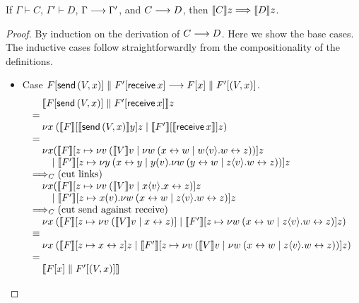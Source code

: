 \documentclass[orivec,envcountsame]{llncs}
\begin{document}
\begin{theorem}\label{thm:gv-reduction-simulated}
If $\Gamma \vdash C$, $\Gamma' \vdash D$, $\Gamma \longrightarrow \Gamma'$, and $C \longrightarrow D$, then $\llbracket C \rrbracket z
\Longrightarrow \llbracket D \rrbracket z$.
\end{theorem}
\begin{proof}
By induction on the derivation of $C \longrightarrow D$. Here we show the base cases. The inductive cases
follow straightforwardly from the compositionality of the definitions.
\begin{itemize}
\item Case $F[\mathsf{send} \, (V,x)] \parallel F'[\mathsf{receive} \, x] \longrightarrow F[x]
  \parallel F'[(V,x)]$.
%
\[
\bl
\quad \tocp{\Fx[\gvconst{send} \app (V,x)] \parallel \Fx'[\gvconst{receive} \app x]}z \\
= \\
\quad \cut{x}{}
        {\tocp{\Fx}[\tocp{\gvconst{send} \app (V,x)}y]z}
        {\tocp{\Fx'}[\tocp{\gvconst{receive} \app x}]z} \\
= \\
\quad
  \nu x(
    {\tocp{\Fx}
      [z \mapsto \cut{v}{}{\tocp{V}v}
        {\cut{w}{}{\link{x}{w}}{w\sd{v}.\link{w}{z}}}]z} \\
\qquad \mid
    {\tocp{\Fx'}
       [z \mapsto \cut{y}{}
          {\link{x}{y}}
          {y(v).\cut{w}{}{\link{y}{w}}{z\sd{v}.\link{w}{z}}}]z} \\
\bigcrto (\text{cut links}) \\
\quad
  \nu x(
    {\tocp{\Fx}
       [z \mapsto \cut{v}{}{\tocp{V}v}
         {x\sd{v}.\link x z}]z} \\
\qquad \mid
    {\tocp{\Fx'}
       [z \mapsto x(v).\cut{w}{}{\link{x}{w}}{z\sd{v}.\link{w}{z}}]z} \\
\bigcrto (\text{cut send against receive}) \\
\quad
  \cut{x}{}
    {\tocp{\Fx}
       [z \mapsto
         \cut{v}{}{\tocp{V}v}{\link x z}]}
    {\tocp{\Fx'}
       [z \mapsto \cut{w}{}{\link{x}{w}}{z\sd{v}.\link{w}{z}}]z} \\
\equiv \\
\quad
  \cut{x}{}
    {\tocp{\Fx}[z \mapsto \link x z]z}
    {\tocp{\Fx'}[z \mapsto
      \cut{v}{}{\tocp{V}v}
        {\cut{w}{}{\link{x}{w}}
          {z\sd{v}.\link{w}{z}}}]z} \\
= \\
\quad \tocp{\Fx[x] \parallel \Fx'[(V,x)]} \\
\el
\]


\end{itemize}
\end{proof}
\end{document}
